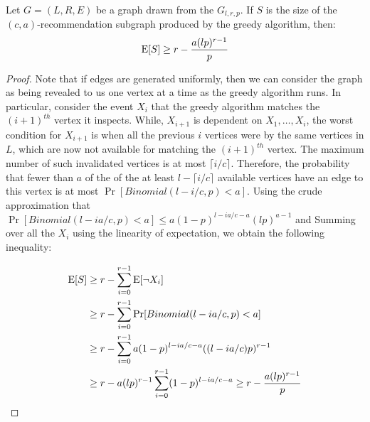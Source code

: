 \begin{thm}
Let $G=(L,R,E)$ be a graph drawn from the $G_{l,r,p}$. If $S$ is the size of the $(c,a)$-recommendation subgraph produced by the greedy algorithm, then:
\[ \text{E}[S] \geq r - \frac{a(lp)^{r-1}}{p}\]
\end{thm}
\begin{proof}
Note that if edges are generated uniformly, then we can consider the
graph as being revealed to us one vertex at a time as the greedy
algorithm runs. In particular, consider the event $X_i$ that the
greedy algorithm matches the $(i+1)^{th}$ vertex it inspects. While,
$X_{i+1}$ is dependent on $X_1,\ldots, X_i$, the worst condition for
$X_{i+1}$ is when all the previous $i$ vertices were by the same
vertices in $L$, which are now not available for matching the
$(i+1)^{th}$ vertex. The maximum number of such invalidated vertices
is at most $\lceil i/c \rceil$. Therefore, the probability that fewer
than $a$ of the of the at least $l-\lceil i/c \rceil $ available 
vertices have an edge to this vertex is at most $\Pr[Binomial(l-i/c,p) < a]$.
Using the crude approximation that
$\Pr[Binomial(l-ia/c,p) < a] \leq a(1-p)^{l-ia/c-a}(lp)^{a-1}$ and
Summing over all the $X_i$ using the linearity of expectation,
we obtain the following inequality:

\begin{align*}
      \text{E}[S]
&\geq r - \sum_{i=0}^{r-1} \text{E}[\lnot X_i] \\
&\geq r - \sum_{i=0}^{r-1} \Pr[Binomial(l-ia/c,p) < a] \\
&\geq r - \sum_{i=0}^{r-1}a(1-p)^{l-ia/c-a}((l-ia/c)p)^{r-1} \\
&\geq r - a(lp)^{r-1}\sum_{i=0}^{r-1}(1-p)^{l-ia/c-a} \geq r - \frac{a(lp)^{r-1}}{p}\\
\end{align*}
\end{proof} 
